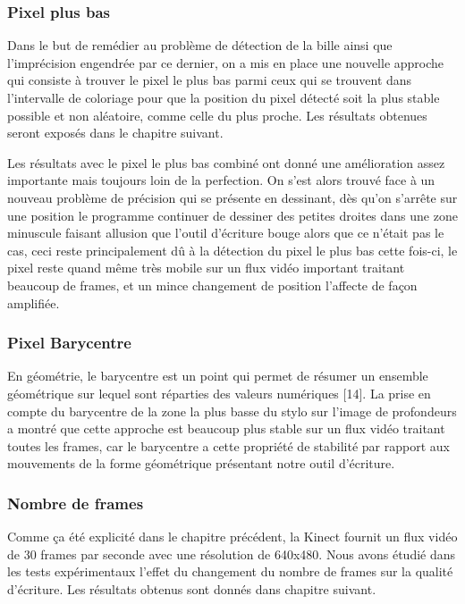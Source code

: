 \documentclass[12pt,a4paper,oneside]{book}
\begin{document}
	\subsubsection{Pixel plus bas}
	Dans le but de remédier au problème de détection de la bille ainsi que l'imprécision engendrée par ce dernier, on a mis en place une nouvelle approche qui consiste à trouver le pixel le plus bas parmi ceux  qui se trouvent dans l'intervalle de coloriage  pour que la position du pixel détecté soit la plus stable possible et non aléatoire, comme celle du plus proche.  Les résultats obtenues seront exposés dans le chapitre suivant.
	
	Les résultats avec le pixel le plus bas combiné ont donné une amélioration assez importante mais toujours loin de la perfection. On s'est alors  trouvé face à un nouveau problème de précision qui se présente en dessinant, dès qu'on s'arrête sur une position le programme continuer de dessiner des petites droites dans une zone minuscule faisant allusion que l'outil d'écriture bouge alors que ce n'était pas le cas, ceci reste principalement dû à la détection du pixel le plus bas cette fois-ci, le pixel reste quand même très mobile sur un flux  vidéo important traitant beaucoup de frames, et un mince changement de position l'affecte de façon amplifiée.
	
	\subsubsection{Pixel Barycentre}
	En géométrie, le barycentre est un point qui permet de résumer un ensemble géométrique sur lequel sont réparties des valeurs numériques [14].
	La prise en compte du barycentre de la zone la plus basse du stylo sur l'image de profondeurs a montré que cette approche est beaucoup plus stable sur un flux vidéo traitant toutes les frames,  car le barycentre a cette propriété de stabilité par rapport aux mouvements de la forme géométrique présentant notre outil d'écriture.
	
	\subsubsection{Nombre de frames}
	Comme ça été explicité dans le chapitre précédent, la Kinect fournit un flux vidéo de 30 frames par seconde avec une résolution de 640x480. Nous avons étudié dans les tests expérimentaux l'effet du changement du nombre de frames sur la qualité d'écriture. Les résultats obtenus sont donnés dans chapitre suivant.
	
\end{document}
